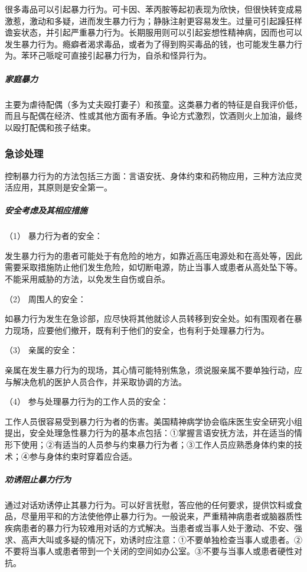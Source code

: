 很多毒品可以引起暴力行为。可卡因、苯丙胺等起初表现为欣快，但很快转变成易激惹，激动和多疑，进而发生暴力行为；静脉注射更容易发生。过量可引起躁狂样谵妄状态，并引起严重暴力行为。长期服用则可以引起妄想性精神病，因而也可以发生暴力行为。瘾癖者渴求毒品，或者为了得到购买毒品的钱，也可能发生暴力行为。苯环己哌啶可直接引起暴力行为，自杀和怪异行为。

\subparagraph{家庭暴力}

主要为虐待配偶（多为丈夫殴打妻子）和孩童。这类暴力者的特征是自我评价低，而且与配偶在经济、性或其他方面有矛盾。争论方式激烈，饮酒则火上加油，最终以殴打配偶和孩子结束。

\subsubsection{急诊处理}

控制暴力行为的方法包括三方面：言语安抚、身体约束和药物应用，三种方法应灵活应用，其原则是安全第一。

\subparagraph{安全考虑及其相应措施}

\hypertarget{text00054.htmlux5cux23CHP1-18-12-3-1-1}{}
（1） 暴力行为者的安全：

发生暴力行为的患者可能处于有危险的地方，如靠近高压电源处和在高处等，因此需要采取措施防止他们发生危险，如切断电源，防止当事人或患者从高处坠下等。不能采用威胁的方法，以免发生自伤或自杀。

\hypertarget{text00054.htmlux5cux23CHP1-18-12-3-1-2}{}
（2） 周围人的安全：

如暴力行为发生在急诊部，应尽快将其他就诊人员转移到安全处。如有围观者在暴力现场，应要他们撤开，既有利于他们的安全，也有利于处理暴力行为。

\hypertarget{text00054.htmlux5cux23CHP1-18-12-3-1-3}{}
（3） 亲属的安全：

亲属在发生暴力行为的现场，其心情可能特别焦急，须说服亲属不要单独行动，应与解决危机的医护人员合作，并采取协调的方法。

\hypertarget{text00054.htmlux5cux23CHP1-18-12-3-1-4}{}
（4） 参与处理暴力行为的工作人员的安全：

工作人员很容易受到暴力行为者的伤害。美国精神病学协会临床医生安全研究小组提出，安全处理急性暴力行为的基本点包括：①掌握言语安抚方法，并在适当的情形下使用；②有适当的人员参与约束暴力行为者；③工作人员应熟悉身体约束的技术；④参与身体约束时穿着应合适。

\subparagraph{劝诱阻止暴力行为}

通过对话劝诱停止其暴力行为。可以好言抚慰，答应他的任何要求，提供饮料或食品，尽量用平和的方法使他停止暴力行为。一般说来，严重精神病患者或脑器质性疾病患者的暴力行为较难用对话的方式解决。当患者或当事人处于激动、不安、强求、高声大叫或多疑的情况下，劝诱时应注意：①不要单独检查当事人或患者。②不要将当事人或患者带到一个关闭的空间如办公室。③不要与当事人或患者硬性对抗。

